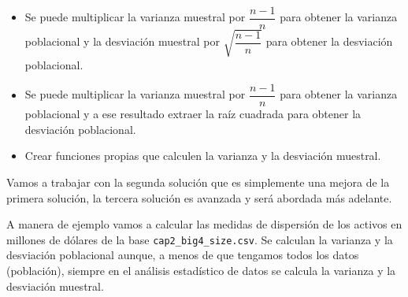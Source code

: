 \documentclass[]{book}
\newenvironment{Shaded}{\begin{snugshade}}{\end{snugshade}}
\newcommand{\DataTypeTok}[1]{\textcolor[rgb]{0.13,0.29,0.53}{#1}}
\newcommand{\DecValTok}[1]{\textcolor[rgb]{0.00,0.00,0.81}{#1}}
\newcommand{\KeywordTok}[1]{\textcolor[rgb]{0.13,0.29,0.53}{\textbf{#1}}}
\newcommand{\NormalTok}[1]{#1}
\newcommand{\OperatorTok}[1]{\textcolor[rgb]{0.81,0.36,0.00}{\textbf{#1}}}
\newcommand{\StringTok}[1]{\textcolor[rgb]{0.31,0.60,0.02}{#1}}
\providecommand{\tightlist}{%
  \setlength{\itemsep}{0pt}\setlength{\parskip}{0pt}}
\begin{document}
\begin{itemize}
\tightlist
\item
  Se puede multiplicar la varianza muestral por \(\dfrac{n-1}{n}\) para obtener la varianza poblacional y la desviación muestral por \(\sqrt{\dfrac{n-1}{n}}\) para obtener la desviación poblacional.
\item
  Se puede multiplicar la varianza muestral por \(\dfrac{n-1}{n}\) para obtener la varianza poblacional y a ese resultado extraer la raíz cuadrada para obtener la desviación poblacional.
\item
  Crear funciones propias que calculen la varianza y la desviación muestral.
\end{itemize}

Vamos a trabajar con la segunda solución que es simplemente una mejora de la primera solución, la tercera solución es avanzada y será abordada más adelante.

A manera de ejemplo vamos a calcular las medidas de dispersión de los activos en millones de dólares de la base \texttt{cap2\_big4\_size.csv}. Se calculan la varianza y la desviación poblacional aunque, a menos de que tengamos todos los datos (población), siempre en el análisis estadístico de datos se calcula la varianza y la desviación muestral.

\begin{Shaded}
\end{Shaded}
\end{document}
